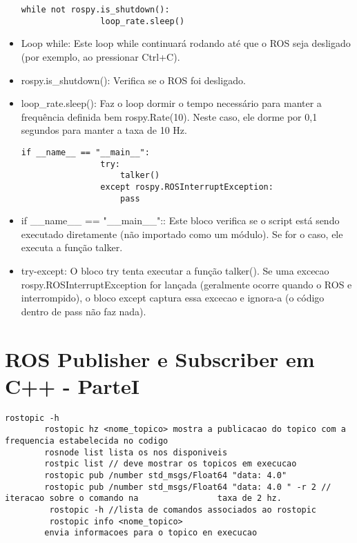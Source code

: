 \documentclass[letterpaper]{article}
\begin{document}
\begin{itemize}
            \begin{lstlisting}[style=pythonStyle, title= base de um nó em python]
                while not rospy.is_shutdown():
                loop_rate.sleep() 
            \end{lstlisting}
            \item Loop while: Este loop while continuará rodando até que o ROS seja desligado (por exemplo, ao pressionar Ctrl+C).
            \item rospy.is\_shutdown(): Verifica se o ROS foi desligado.
            \item loop\_rate.sleep(): Faz o loop dormir o tempo necessário para manter a frequência definida bem rospy.Rate(10). Neste caso, ele dorme por 0,1 segundos para manter a taxa de 10 Hz.
             \begin{lstlisting}[style=pythonStyle, title= diretiva main]
                if __name__ == "__main__":
                try:
                    talker()
                except rospy.ROSInterruptException:
                    pass
            \end{lstlisting}
            \item if \_\_name\_\_ == "\_\_main\_\_":: Este bloco verifica se o script está sendo executado diretamente (não importado como um módulo). Se for o caso, ele executa a função talker.
            \item try-except: O bloco try tenta executar a função talker(). Se uma excecao rospy.ROSInterruptException for lançada (geralmente ocorre quando o ROS e interrompido), o bloco except captura essa excecao e ignora-a (o código dentro de pass não faz nada).
            
        \end{itemize}
    
    
\section{ROS Publisher e Subscriber em C++ - ParteI}
    \begin{lstlisting}[style=bashStyle, title=terminal ROS] 
        rostopic -h
        rostopic hz <nome_topico> mostra a publicacao do topico com a frequencia estabelecida no codigo
        rosnode list lista os nos disponiveis
        rostpic list // deve mostrar os topicos em execucao
        rostopic pub /number std_msgs/Float64 "data: 4.0" 
        rostopic pub /number std_msgs/Float64 "data: 4.0 " -r 2 // iteracao sobre o comando na                taxa de 2 hz.
         rostopic -h //lista de comandos associados ao rostopic
         rostopic info <nome_topico>
        envia informacoes para o topico en execucao
    \end{lstlisting}
    
\end{document}
